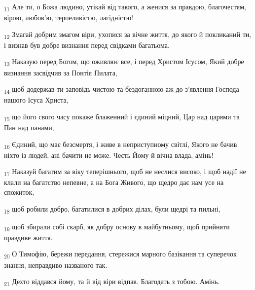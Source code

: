 \begin{tcolorbox}
\textsubscript{11} Але ти, о Божа людино, утікай від такого, а женися за правдою, благочестям, вірою, любов'ю, терпеливістю, лагідністю!
\end{tcolorbox}
\begin{tcolorbox}
\textsubscript{12} Змагай добрим змагом віри, ухопися за вічне життя, до якого й покликаний ти, і визнав був добре визнання перед свідками багатьома.
\end{tcolorbox}
\begin{tcolorbox}
\textsubscript{13} Наказую перед Богом, що оживлює все, і перед Христом Ісусом, Який добре визнання засвідчив за Понтія Пилата,
\end{tcolorbox}
\begin{tcolorbox}
\textsubscript{14} щоб додержав ти заповідь чистою та бездоганною аж до з'явлення Господа нашого Ісуса Христа,
\end{tcolorbox}
\begin{tcolorbox}
\textsubscript{15} що його свого часу покаже блаженний і єдиний міцний, Цар над царями та Пан над панами,
\end{tcolorbox}
\begin{tcolorbox}
\textsubscript{16} Єдиний, що має безсмертя, і живе в неприступному світлі, Якого не бачив ніхто із людей, ані бачити не може. Честь Йому й вічна влада, амінь!
\end{tcolorbox}
\begin{tcolorbox}
\textsubscript{17} Наказуй багатим за віку теперішнього, щоб не неслися високо, і щоб надії не клали на багатство непевне, а на Бога Живого, що щедро дає нам усе на спожиток,
\end{tcolorbox}
\begin{tcolorbox}
\textsubscript{18} щоб робили добро, багатилися в добрих ділах, були щедрі та пильні,
\end{tcolorbox}
\begin{tcolorbox}
\textsubscript{19} щоб збирали собі скарб, як добру основу в майбутньому, щоб прийняти правдиве життя.
\end{tcolorbox}
\begin{tcolorbox}
\textsubscript{20} О Тимофію, бережи передання, стережися марного базікання та суперечок знання, неправдиво названого так.
\end{tcolorbox}
\begin{tcolorbox}
\textsubscript{21} Дехто віддався йому, та й від віри відпав. Благодать з тобою. Амінь.
\end{tcolorbox}
